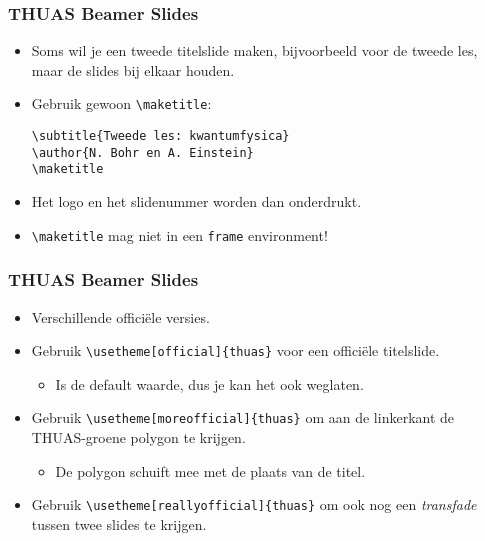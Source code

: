 \documentclass[fleqn,aspectratio=169,dutch,10pt]{beamer}
\begin{document}
\begin{frame}[fragile]
\frametitle{THUAS Beamer Slides}
\begin{itemize}
\item Soms wil je een tweede titelslide maken, bijvoorbeeld voor de tweede les, maar de slides bij elkaar houden.
\item Gebruik gewoon \lstinline|\maketitle|:
\begin{lstlisting}
\subtitle{Tweede les: kwantumfysica}
\author{N. Bohr en A. Einstein}
\maketitle
\end{lstlisting}
\item Het logo en het slidenummer worden dan onderdrukt.
\item \lstinline|\maketitle| mag niet in een \lstinline|frame| environment!
\end{itemize}
\end{frame}


\begin{frame}[fragile]
\frametitle{THUAS Beamer Slides}
\begin{itemize}
\item Verschillende offici\"ele versies.
\item Gebruik \lstinline|\usetheme[official]{thuas}| voor een offici\"ele titelslide.
\begin{itemize}
\item Is de default waarde, dus je kan het ook weglaten.
\end{itemize}
\item Gebruik \lstinline|\usetheme[moreofficial]{thuas}| om aan de linkerkant de THUAS-groene polygon te krijgen.
\begin{itemize}
\item De polygon schuift mee met de plaats van de titel.
\end{itemize}
\item Gebruik \lstinline|\usetheme[reallyofficial]{thuas}| om ook nog een \textsl{transfade} tussen twee slides te krijgen.
\end{itemize}
\end{frame}
\end{document}
